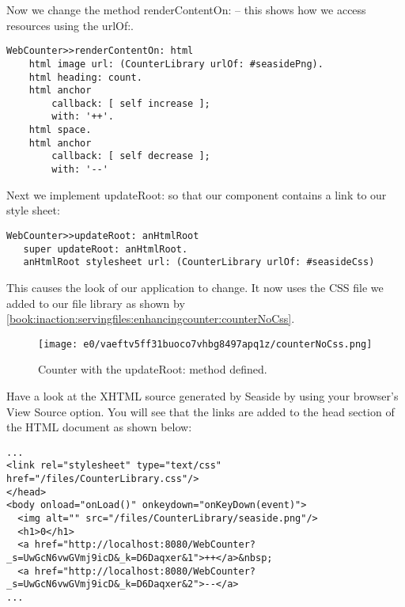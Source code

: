 \documentclass[a4paper,10pt,twoside]{book}
\newcommand{\ct}[1]{{\small\ttfamily\textup{#1}}}
\begin{document}
Now we change the method \ct{renderContentOn:} -- this shows how we access resources using the  \ct{urlOf:}.

\begin{lstlisting}
WebCounter>>renderContentOn: html
    html image url: (CounterLibrary urlOf: #seasidePng).
    html heading: count.
    html anchor
        callback: [ self increase ];
        with: '++'.
    html space.
    html anchor
        callback: [ self decrease ];
        with: '--'
\end{lstlisting}

Next we implement  \ct{updateRoot:} so that our component contains a link to our style sheet:

\begin{lstlisting}
WebCounter>>updateRoot: anHtmlRoot
   super updateRoot: anHtmlRoot.
   anHtmlRoot stylesheet url: (CounterLibrary urlOf: #seasideCss)
\end{lstlisting}

This causes the look of our application to change. It now uses the CSS file we added to our file library as shown by \autoref{book:inaction:servingfiles:enhancingcounter:counterNoCss}.

\begin{figure}[h!tbp]
	\begin{center}
		\texttt{[image: e0/vaeftv5ff31buoco7vhbg8497apq1z/counterNoCss.png]}
		\caption{Counter with the updateRoot: method defined.\label{book:inaction:servingfiles:enhancingcounter:counterNoCss}}
	\end{center}
\end{figure}


Have a look at the XHTML source generated by Seaside by using your browser's View Source option. You will see that the links are added to the head section of the HTML document as shown below:

\begin{lstlisting}
...
<link rel="stylesheet" type="text/css" href="/files/CounterLibrary.css"/>
</head>
<body onload="onLoad()" onkeydown="onKeyDown(event)">
  <img alt="" src="/files/CounterLibrary/seaside.png"/>
  <h1>0</h1>
  <a href="http://localhost:8080/WebCounter?_s=UwGcN6vwGVmj9icD&_k=D6Daqxer&1">++</a>&nbsp;
  <a href="http://localhost:8080/WebCounter?_s=UwGcN6vwGVmj9icD&_k=D6Daqxer&2">--</a>
...
\end{lstlisting}
\end{document}

